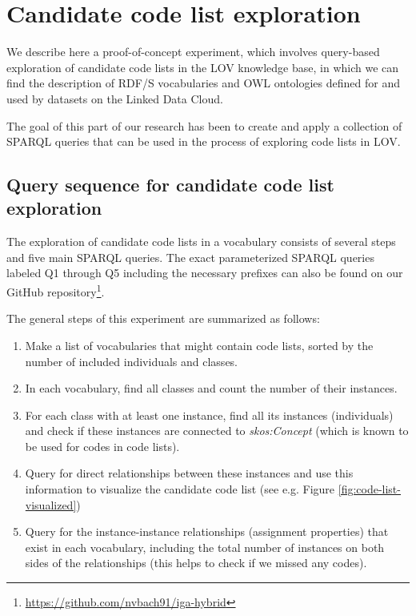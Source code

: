 \section{Candidate code list exploration} 
\label{s:codelistanalyzer}

We describe here a proof-of-concept experiment, which involves query-based exploration of candidate code lists in the LOV knowledge base, in which we can find the description of RDF/S vocabularies and OWL ontologies defined for and used by datasets on the Linked Data Cloud.

The goal of this part of our research has been to create and apply a collection of SPARQL queries that can be used in the process of exploring code lists in LOV. %

\subsection{Query sequence for candidate code list exploration}
The exploration of candidate code lists in a vocabulary consists of several steps and five main SPARQL queries. The exact parameterized SPARQL queries labeled Q1 through Q5 including the necessary prefixes can also be found on our GitHub repository\footnote{\url{https://github.com/nvbach91/iga-hybrid}}.

The general steps of this experiment are summarized as follows:

\begin{enumerate}
    \item Make a list of vocabularies that might contain code lists, sorted by the number of included individuals and classes.

    \item In each vocabulary, find all classes and count the number of their instances.%

    \item For each class with at least one instance, find all its instances (individuals) and check if these instances are connected to \emph{skos:Concept} (which is known to be used for codes in code lists).

    \item Query for direct relationships between these instances and use this information to visualize the candidate code list (see e.g. Figure \ref{fig:code-list-visualized})

    \item Query for the instance-instance relationships (assignment properties) that exist in each vocabulary, including the total number of instances on both sides of the relationships (this helps to check if we missed any codes).

\end{enumerate}


